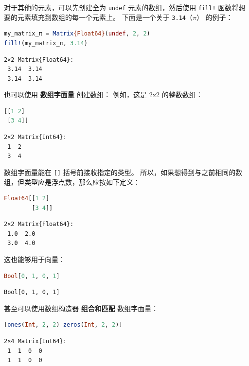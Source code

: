 \documentclass[
  notoc %
]{tufte-book}
\newcommand{\passthrough}[1]{#1}
\begin{document}
对于其他的元素，可以先创建全为 \passthrough{\lstinline!undef!}
元素的数组，然后使用 \passthrough{\lstinline"fill!"}
函数将想要的元素填充到数组的每一个元素上。 下面是一个关于
\passthrough{\lstinline!3.14!}（\(\pi\)） 的例子：

\begin{lstlisting}[language=Julia]
my_matrix_π = Matrix{Float64}(undef, 2, 2)
fill!(my_matrix_π, 3.14)
\end{lstlisting}

\begin{lstlisting}[language=Output]
2×2 Matrix{Float64}:
 3.14  3.14
 3.14  3.14
\end{lstlisting}

也可以使用 \textbf{数组字面量} 创建数组： 例如，这是 2x2 的整数数组：

\begin{lstlisting}[language=Julia]
[[1 2]
 [3 4]]
\end{lstlisting}

\begin{lstlisting}[language=Output]
2×2 Matrix{Int64}:
 1  2
 3  4
\end{lstlisting}

数组字面量能在 \passthrough{\lstinline![]!} 括号前接收指定的类型。
所以，如果想得到与之前相同的数组，但类型应是浮点数，那么应按如下定义：

\begin{lstlisting}[language=Julia]
Float64[[1 2]
        [3 4]]
\end{lstlisting}

\begin{lstlisting}[language=Output]
2×2 Matrix{Float64}:
 1.0  2.0
 3.0  4.0
\end{lstlisting}

这也能够用于向量：

\begin{lstlisting}[language=Julia]
Bool[0, 1, 0, 1]
\end{lstlisting}

\begin{lstlisting}[language=Output]
Bool[0, 1, 0, 1]
\end{lstlisting}

甚至可以使用数组构造器 \textbf{组合和匹配} 数组字面量：

\begin{lstlisting}[language=Julia]
[ones(Int, 2, 2) zeros(Int, 2, 2)]
\end{lstlisting}

\begin{lstlisting}[language=Output]
2×4 Matrix{Int64}:
 1  1  0  0
 1  1  0  0
\end{lstlisting}
\end{document}
